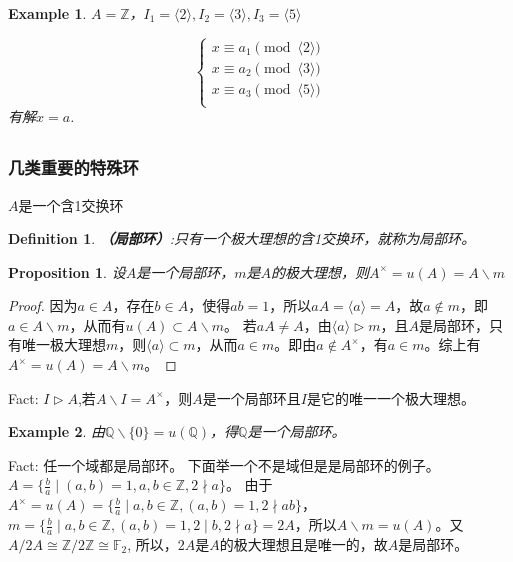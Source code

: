 \documentclass[UTF8]{article}
\newtheorem{defn}{Definition}[section]
\newtheorem{prop}{Proposition}[section]
\newtheorem{exa}{Example}[section]
\begin{document}
\begin{exa}
	$A=\mathbb Z$，$I_1=\langle 2\rangle,I_2=\langle 3\rangle,I_3=\langle 5\rangle$
	
	\[\begin{cases}
	x\equiv a_1 \pmod{\langle 2\rangle}\\
	x\equiv a_2 \pmod{\langle 3\rangle}\\
	x\equiv a_3 \pmod{\langle 5\rangle}\\
	\end{cases}\]
	有解$x=a$.
\end{exa}

\subsection{}
\subsubsection{几类重要的特殊环}
$A$是一个含1交换环
\begin{defn}
	\textbf{（局部环）}:只有一个极大理想的含1交换环，就称为局部环。
\end{defn}

\begin{prop}
	设$A$是一个局部环，$m$是$A$的极大理想，则$A^\times=u(A)=A\backslash m$
\end{prop}
\begin{proof}
	因为$a\in A$，存在$b\in A$，使得$ab=1$，所以$aA=\langle a\rangle=A$，故$a\notin m$，即$a\in A\backslash m$，从而有$u(A)\subset A\backslash m$。
	若$aA\neq A$，由$\langle a\rangle\triangleright m$，且$A$是局部环，只有唯一极大理想$m$，则$\langle a\rangle\subset m$，从而$a\in m$。即由$a\notin A^\times$，有$a\in m$。综上有$A^\times=u(A)=A\backslash m$。
\end{proof}

Fact: $I\triangleright A$,若$A\backslash I=A^\times$，则$A$是一个局部环且$I$是它的唯一一个极大理想。

\begin{exa}
	由$\mathbb Q\backslash\{0\}=u(\mathbb Q)$，得$\mathbb Q$是一个局部环。
\end{exa}

Fact: 任一个域都是局部环。
下面举一个不是域但是是局部环的例子。
$A=\{\frac{b}{a}\mid (a,b)=1,a,b\in\mathbb Z,2\nmid a\}$。
由于$A^\times=u(A)=\{\frac{b}{a}\mid a,b\in \mathbb Z,(a,b)=1,2\nmid ab\}$，$m=\{\frac{b}{a}\mid a,b\in\mathbb Z,(a,b)=1,2\mid b,2\nmid a\}=2A$，所以$A\backslash m=u(A)$。又$A/2A\cong\mathbb Z/{2\mathbb Z}\cong\mathbb F_2$,
所以，$2A$是$A$的极大理想且是唯一的，故$A$是局部环。
\end{document}
